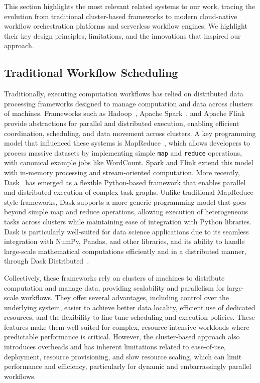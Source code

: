 \documentclass[conference]{IEEEtran}
\begin{document}
This section highlights the most relevant related systems to our work, tracing the evolution from traditional cluster-based frameworks to modern cloud-native workflow orchestration platforms and serverless workflow engines. We highlight their key design principles, limitations, and the innovations that inspired our approach.

\subsection{Traditional Workflow Scheduling}
Traditionally, executing computation workflows has relied on distributed data processing frameworks designed to manage computation and data across clusters of machines. Frameworks such as Hadoop~\cite{apache_hadoop}, Apache Spark~\cite{apache_spark}, and Apache Flink~\cite{apache_flink} provide abstractions for parallel and distributed execution, enabling efficient coordination, scheduling, and data movement across clusters. A key programming model that influenced these systems is MapReduce~\cite{mapreduce}, which allows developers to process massive datasets by implementing simple \texttt{map} and \texttt{reduce} operations, with canonical example jobs like WordCount. Spark and Flink extend this model with in-memory processing and stream-oriented computation. More recently, Dask~\cite{dask_python} has emerged as a flexible Python-based framework that enables parallel and distributed execution of complex task graphs. Unlike traditional MapReduce-style frameworks, Dask supports a more generic programming model that goes beyond simple map and reduce operations, allowing execution of heterogeneous tasks across clusters while maintaining ease of integration with Python libraries. Dask is particularly well-suited for data science applications due to its seamless integration with NumPy, Pandas, and other libraries, and its ability to handle large-scale mathematical computations efficiently and in a distributed manner, through Dask Distributed~\cite{dask_python_distributed}.

Collectively, these frameworks rely on clusters of machines to distribute computation and manage data, providing scalability and parallelism for large-scale workflows. They offer several advantages, including control over the underlying system, easier to achieve better data locality, efficient use of dedicated resources, and the flexibility to fine-tune scheduling and execution policies. These features make them well-suited for complex, resource-intensive workloads where predictable performance is critical. However, the cluster-based approach also introduces overheads and has inherent limitations related to ease-of-use, deployment, resource provisioning, and slow resource scaling, which can limit performance and efficiency, particularly for dynamic and embarrassingly parallel workflows.
\end{document}
